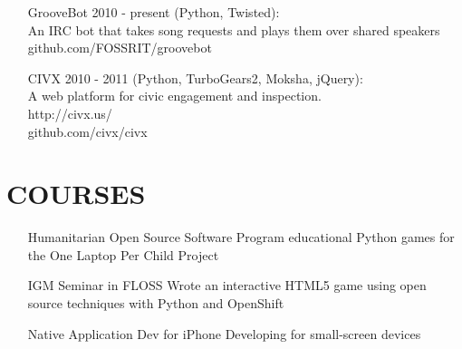 \documentclass[line]{res}
\begin{document}
\begin{resume}
\begin{itemize}
        \item[GrooveBot]
            2010 - present (Python, Twisted):\\
            An IRC bot that takes song requests and plays them over shared speakers\\
            github.com/FOSSRIT/groovebot

        \item[CIVX]
            2010 - 2011 (Python, TurboGears2, Moksha, jQuery):\\
            A web platform for civic engagement and inspection.\\
            http://civx.us/\\
            github.com/civx/civx
    \end{itemize}

\section{COURSES}
    \begin{itemize}
        \item[Humanitarian Open Source Software] Program educational Python
            games for the One Laptop Per Child Project
        \item[IGM Seminar in FLOSS] Wrote an interactive HTML5 game using open
            source techniques with Python and OpenShift
        \item[Native Application Dev for iPhone] Developing for small-screen
            devices
    \end{itemize}


\end{resume}
\end{document}
